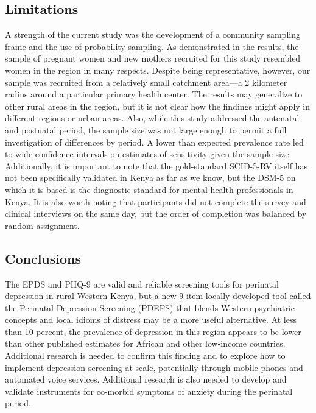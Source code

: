 \documentclass[man,natbib,longtable]{apa6}\usepackage[]{graphicx}\usepackage[]{color}
\begin{document}
\subsection{Limitations}

A strength of the current study was the development of a community sampling frame and the use of probability sampling. As demonstrated in the results, the sample of pregnant women and new mothers recruited for this study resembled women in the region in many respects. Despite being representative, however, our sample was recruited from a relatively small catchment area---a 2 kilometer radius around a particular primary health center. The results may generalize to other rural areas in the region, but it is not clear how the findings might apply in different regions or urban areas. Also, while this study addressed the antenatal and postnatal period, the sample size was not large enough to permit a full investigation of differences by period. A lower than expected prevalence rate led to wide confidence intervals on estimates of sensitivity given the sample size. Additionally, it is important to note that the gold-standard SCID-5-RV itself has not been specifically validated in Kenya as far as we know, but the DSM-5 on which it is based is the diagnostic standard for mental health professionals in Kenya. It is also worth noting that participants did not complete the survey and clinical interviews on the same day, but the order of completion was balanced by random assignment. 

\subsection{Conclusions}

The EPDS and PHQ-9 are valid and reliable screening tools for perinatal depression in rural Western Kenya, but a new 9-item locally-developed tool called the Perinatal Depression Screening (PDEPS) that blends Western psychiatric concepts and local idioms of distress may be a more useful alternative. At less than 10 percent, the prevalence of depression in this region appears to be lower than other published estimates for African and other low-income countries. Additional research is needed to confirm this finding and to explore how to implement depression screening at scale, potentially through mobile phones and automated voice services. Additional research is also needed to develop and validate instruments for co-morbid symptoms of anxiety during the perinatal period.
\end{document}
